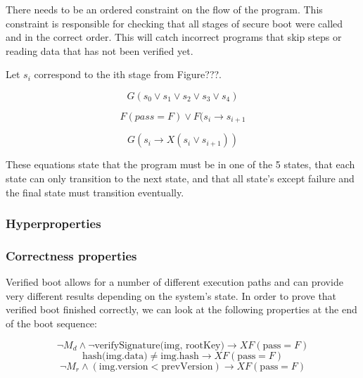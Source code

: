 \documentclass[../report.tex]{subfiles}
\begin{document}
There needs to be an ordered constraint on the flow of the program. 
This constraint is responsible for checking that all stages of secure boot were called and in the correct order.
This will catch incorrect programs that skip steps or reading data that has not been verified yet.

Let $s_i$ correspond to the ith stage from Figure???.

\begin{equation}
    G(s_0 \lor s_1 \lor s_2 \lor s_3 \lor s_4)
\end{equation}

\begin{equation}
    F(pass = F) \lor F(s_i \to s_{i+1}
\end{equation}

\begin{equation}
    G(s_i \to X(s_i \lor s_{i+1}))
\end{equation}

These equations state that the program must be in one of the 5 states, that each state can only transition to the next state, and that all state's except failure and the final state must transition eventually.

\subsubsection{Hyperproperties}


\subsubsection{Correctness properties}

Verified boot allows for a number of different execution paths and can provide very different results depending on the system's state.
In order to prove that verified boot finished correctly, we can look at the following properties at the end of the boot sequence:

\begin{equation} \label{eq:sig_cor}
 \lnot M_d \land \lnot \text{verifySignature(img, rootKey)} \to XF (\text{pass} = F)
\end{equation}
\begin{equation} \label{eq:hash_cor}
    \text{hash(img.data)} \neq \text{img.hash} \to XF (\text{pass} = F)
\end{equation}
\begin{equation} \label{eq:rollback}
    \lnot M_r \land (\text{img.version} < \text{prevVersion}) \to XF (\text{pass} = F)
\end{equation}
\end{document}

